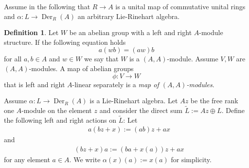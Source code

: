 \documentclass{amsart}
\theoremstyle{plain}
\theoremstyle{definition}
\newtheorem{definition}[theorem]{Definition}
\theoremstyle{remark}
\numberwithin{equation}{theorem}
\begin{document}
Assume in the following that ${R}\rightarrow {A}$ is a unital map of commutative unital rings and $\alpha:L\rightarrow {\operatorname{Der} }_R(A)$
an arbitrary Lie-Rinehart algebra.

\begin{definition} Let $W$ be an abelian group with a left and right ${A}$-module structure.
If the following equation holds
\[ a(wb)=(aw)b \]
for all $a,b \in {A}$ and $w\in W$ we say that $W $ is a $({A},{A})$-module.
Assume $V,W$ are $({A},{A})$-modules. A map of abelian groups
\[ \phi: V\rightarrow W\]
that is left and right ${A}$-linear separately is a \emph{map of $({A},{A})$-modules}.
\end{definition}

Assume
$\alpha:L\rightarrow {\operatorname{Der} }_{R}({A})$ is a Lie-Rinehart algebra. Let ${A} z$ be the free rank one ${A}$-module on the element
$z$ and consider the direct sum $\tilde{L}:={A} z\oplus L$. Define the following left and right actions on ${\tilde{L} }$:
Let
\begin{align}
&\label{m1} a(bz+x):=(ab)z+ax
\end{align}
and
\begin{align}
&\label{m2} (bz+x)a:=(ba+x(a))z+ax
\end{align}
for any element $a\in {A}$. We write $\alpha(x)(a):=x(a) $ for simplicity.
\end{document}

